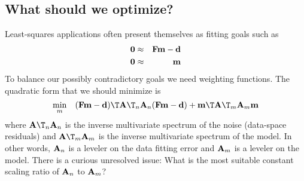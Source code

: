 \subsection{What should we optimize?}
Least-squares applications often present themselves as fitting goals such as
\begin{eqnarray}
\bold 0 &\approx&  \bold F \bold m - \bold d\\
\bold 0 &\approx&          \bold m
\end{eqnarray}
To balance our possibly contradictory goals we need weighting functions.
The quadratic form that we should minimize is
\begin{equation}
\min_m \quad
(\bold F \bold m - \bold d)\T
\bold A\T_n \bold A_n
(\bold F \bold m - \bold d)
         +
         \bold m\T \bold A\T_m \bold A_m \bold m
\end{equation}
where $\bold A\T_n \bold A_n$ is the inverse multivariate spectrum of the noise
(data-space residuals) and
$\bold A\T_m \bold A_m$ is the inverse multivariate spectrum of the model.
In other words,
$\bold A_n$ is a leveler on the data fitting error and
$\bold A_m$ is a leveler on the model.
There is a curious unresolved issue:
What is the most suitable constant scaling ratio
of $\bold A_n$ to $\bold A_m$?
%
